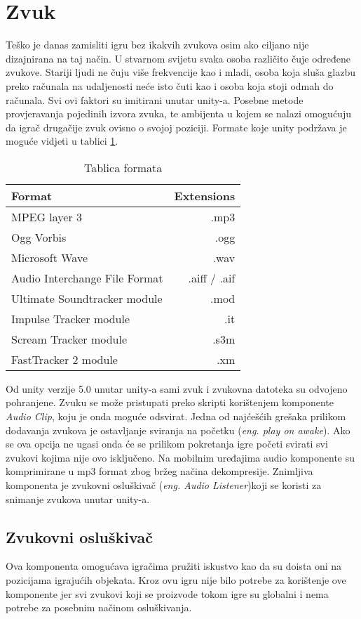 \section{Zvuk}
Teško je danas zamisliti igru bez ikakvih zvukova osim ako ciljano nije dizajnirana na taj način. U stvarnom svijetu svaka osoba različito čuje određene zvukove. Stariji ljudi ne čuju više frekvencije kao i mladi, osoba koja sluša glazbu preko računala na udaljenosti neće isto čuti kao i osoba koja stoji odmah do računala. Svi ovi faktori su imitirani unutar unity-a. Posebne metode provjeravanja pojedinih izvora zvuka, te ambijenta u kojem se nalazi omogućuju da igrač drugačije zvuk ovisno o svojoj poziciji. Formate koje unity podržava je moguće vidjeti u tablici \ref{table:tablicaFormata}.

\begin{table}[h]
\large
\begin{tabular}{ l | r } \hline	
	Format & Extensions \\
	\hline MPEG layer 3 & .mp3 \\
	\hline Ogg Vorbis  & .ogg \\
	\hline Microsoft Wave  & .wav \\
	\hline Audio Interchange File Format & .aiff / .aif \\
	\hline Ultimate Soundtracker module  & .mod \\
	\hline Impulse Tracker module  & .it \\
	\hline Scream Tracker module & .s3m \\
	\hline FastTracker 2 module  & .xm \\
\end{tabular}
	\label{table:tablicaFormata}
	\caption{Tablica formata}
\end{table}

Od unity verzije 5.0 unutar unity-a sami zvuk i zvukovna datoteka su odvojeno pohranjene. Zvuku se može pristupati preko skripti korištenjem komponente \emph{Audio Clip}, koju je onda moguće odsvirat. Jedna od najćešćih grešaka prilikom dodavanja zvukova je ostavljanje sviranja na početku (\emph{eng. play on awake}). Ako se ova opcija ne ugasi onda će se prilikom pokretanja igre početi svirati svi zvukovi kojima nije ovo isključeno. Na mobilnim uređajima audio komponente su komprimirane u mp3 format zbog bržeg načina dekompresije. Znimljiva komponenta je zvukovni osluškivač (\emph{eng. Audio Listener})koji se koristi za snimanje zvukova unutar unity-a.
\newpage
\subsection{Zvukovni osluškivač}
Ova komponenta omogućava igračima pružiti iskustvo kao da su doista oni na pozicijama igrajućih objekata. Kroz ovu igru nije bilo potrebe za korištenje ove komponente jer svi zvukovi koji se proizvode tokom igre su globalni i nema potrebe za posebnim načinom osluškivanja.